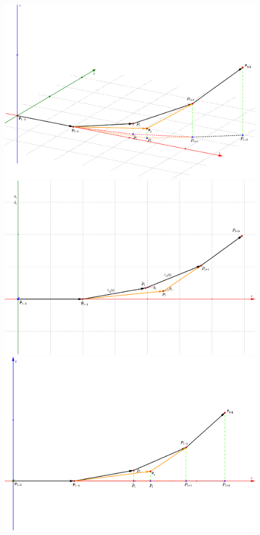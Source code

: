 \documentclass[utf8]{ctexart} %
\begin{document}
	 \begin{figure}[ht]
	 	\centering
	 	\label{algorithm_explain}
	 	\begin{minipage}[b]{0.33\textwidth} %
	 		\centering
	 		\includegraphics[width=\textwidth]{figures/al_main.png}
	 	\end{minipage}\hfill
	 	\begin{minipage}[b]{0.33\textwidth} %
	 		\centering
	 		\includegraphics[width=\textwidth]{figures/al_top.png}
	 	\end{minipage}
 	\begin{minipage}[b]{0.33\textwidth} %
 	\centering
 	\includegraphics[width=\textwidth]{figures/al_front.png}

\end{minipage}
\end{figure}
\end{document}
